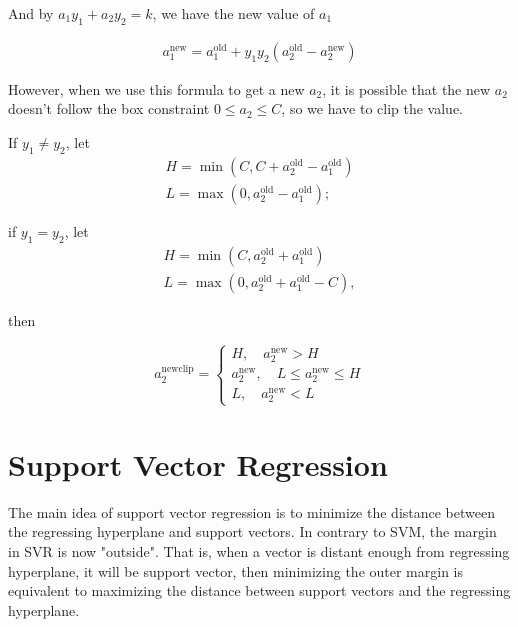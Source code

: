 \documentclass[a4paper]{report}
\begin{document}
And by $a_1y_1+a_2y_2=k$, we have the new value of $a_1$

\begin{align}
    a_1^{\mathrm{new}}=a_1^{\mathrm{old}}+ y_1y_2(a_2^{\mathrm{old}}- a_2^{\mathrm{new}})
\end{align}

%

However, when we use this formula to get a new $a_2$, it is possible that the new $a_2$ doesn't follow the box constraint $0\leq a_2\leq C$, so we have to clip the value.

If $y_1\neq y_2$, let 
\begin{align*}
    H=\min(C,C+a_2^{\mathrm{old}}-a_1^{\mathrm{old}}) \\
    L=\max(0,a_2^{\mathrm{old}}-a_1^{\mathrm{old}});
\end{align*}

if $y_1=y_2$,  let 
\begin{align*}
    H=\min(C,a_2^{\mathrm{old}}+a_1^{\mathrm{old}}) \\
    L=\max(0,a_2^{\mathrm{old}}+a_1^{\mathrm{old}}-C),
\end{align*}

then

\[
    a_2^{\mathrm{new clip}} = 
    \begin{cases}
        H, \quad a_2^{\mathrm{new}}>H \\
        a_2^{\mathrm{new}}, \quad L\leq a_2^{\mathrm{new}} \leq H \\
        L, \quad a_2^{\mathrm{new}} <L
    \end{cases}
\]

\section{Support Vector Regression}

The main idea of support vector regression\cite{drucker1997support} is to minimize the distance between the regressing hyperplane and support vectors. In contrary to SVM, the margin in SVR is now "outside". That is, when a vector is distant enough from regressing hyperplane, it will be support vector, then minimizing the outer margin is equivalent to maximizing the distance between support vectors and the regressing hyperplane.
\end{document}
